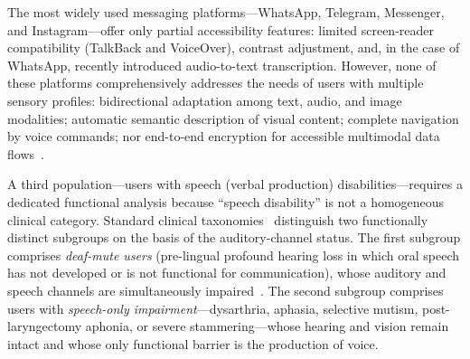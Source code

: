 \documentclass[journal]{IEEEtran}
\begin{document}
	The most widely used messaging platforms---WhatsApp, Telegram, Messenger, and Instagram---offer only partial accessibility features: limited screen-reader compatibility (TalkBack and VoiceOver), contrast adjustment, and, in the case of WhatsApp, recently introduced audio-to-text transcription. However, none of these platforms comprehensively addresses the needs of users with multiple sensory profiles: bidirectional adaptation among text, audio, and image modalities; automatic semantic description of visual content; complete navigation by voice commands; nor end-to-end encryption for accessible multimodal data flows~\cite{bercaru2024,weichbroth2020}.
	
	A third population---users with speech (verbal production) disabilities---requires a dedicated functional analysis because ``speech disability'' is not a homogeneous clinical category. Standard clinical taxonomies~\cite{elsahar2019,bleakley2022,costanzo2023} distinguish two functionally distinct subgroups on the basis of the auditory-channel status. The first subgroup comprises \emph{deaf-mute users} (pre-lingual profound hearing loss in which oral speech has not developed or is not functional for communication), whose auditory and speech channels are simultaneously impaired~\cite{saleem2023,kothadiya2022}. The second subgroup comprises users with \emph{speech-only impairment}---dysarthria, aphasia, selective mutism, post-laryngectomy aphonia, or severe stammering---whose hearing and vision remain intact and whose only functional barrier is the production of voice.
	
\end{document}
